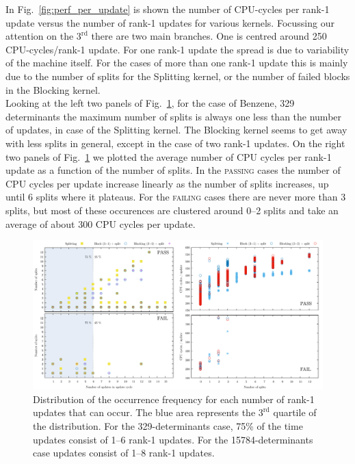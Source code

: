 \documentclass[11pt]{article}
\numberwithin{figure}{section}
\numberwithin{table}{section}
\begin{document}
			In Fig.~\ref{fig:perf_per_update} is shown the number of CPU-cycles per rank-1 update versus the number of rank-1 updates for various kernels. Focussing our attention on the $3^\mathrm{rd}$ there are two main branches. One is centred around 250 CPU-cycles/rank-1 update. For one rank-1 update the spread is due to variability of the machine itself. For the cases of more than one rank-1 update this is mainly due to the number of splits for the Splitting kernel, or the number of failed blocks in the Blocking kernel.\\
							
			Looking at the left two panels of Fig.~\ref{upds_nsplits_cpucycles}, for the case of Benzene, 329 determinants the maximum number of splits is always one less than the number of updates, in case of the Splitting kernel. The Blocking kernel seems to get away with less splits in general, except in the case of two rank-1 updates. On the right two panels of Fig.~\ref{upds_nsplits_cpucycles} we plotted the average number of CPU cycles per rank-1 update as a function of the number of splits. In  the \textsc{passing} cases the number of CPU cycles per update increase linearly as the number of splits increases, up until 6 splits where it plateaus. For the \textsc{failing} cases there are never more than 3 splits, but most of these occurences are clustered around 0--2 splits and take an average of about 300 CPU cycles per update. 

			\begin{figure}[h]
				\centering
				\includegraphics[width=1\textwidth]{upds_nsplits_cpucycles.png}
				\caption{Distribution of the occurrence frequency for each number of rank-1 updates that can occur. The blue area represents the $3^\mathrm{rd}$ quartile of the distribution. For the 329-determinants case, 75\% of the time updates consist of 1--6 rank-1 updates. For the 15784-determinants case updates consist of 1--8 rank-1 updates.}
				\label{upds_nsplits_cpucycles}
			\end{figure}
						
\end{document}

